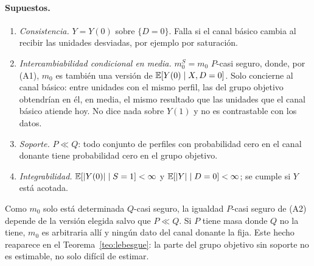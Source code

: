 \paragraph{Supuestos.}
\begin{enumerate}[label=(A\arabic*)]
  \item \emph{Consistencia.} $Y=Y(0)$ sobre $\{D=0\}$. Falla si el canal básico cambia al recibir las unidades desviadas, por ejemplo por saturación.
  \item \emph{Intercambiabilidad condicional en media.} $m_0^S=m_0$ $P$-casi seguro, donde, por (A1), $m_0$ es también una versión de $\mathbb{E}[Y(0)\mid X,D=0]$. Solo concierne al canal básico: entre unidades con el mismo perfil, las del grupo objetivo obtendrían en él, en media, el mismo resultado que las unidades que el canal básico atiende hoy. No dice nada sobre $Y(1)$ y no es contrastable con los datos.
  \item \emph{Soporte.} $P\ll Q$: todo conjunto de perfiles con probabilidad cero en el canal donante tiene probabilidad cero en el grupo objetivo.
  \item \emph{Integrabilidad.} $\mathbb{E}[|Y(0)|\mid S=1]<\infty$ y $\mathbb{E}[|Y|\mid D=0]<\infty$; se cumple si $Y$ está acotada.
\end{enumerate}

\begin{observacion}[A2 presupone A3]\label{obs:a2a3}
Como $m_0$ solo está determinada $Q$-casi seguro, la igualdad $P$-casi seguro de (A2) depende de la versión elegida salvo que $P\ll Q$. Si $P$ tiene masa donde $Q$ no la tiene, $m_0$ es arbitraria allí y ningún dato del canal donante la fija. Este hecho reaparece en el Teorema~\ref{teo:lebesgue}: la parte del grupo objetivo sin soporte no es estimable, no solo difícil de estimar.
\end{observacion}

